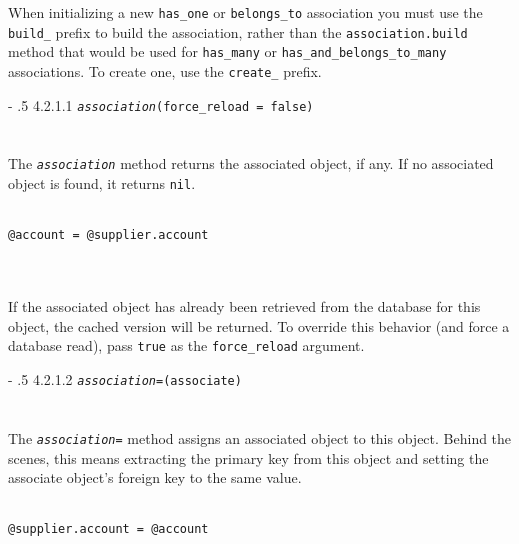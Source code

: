 \documentclass[10pt]{book}
\makeatletter
\renewcommand\paragraph{%
   \@startsection{paragraph}{4}{0mm}%
      {-\baselineskip}%
      {.5\baselineskip}%
      {\normalfont\scriptsize\bfseries}}
\makeatother
\begin{document}
When initializing a new \texttt{has\_one} or \texttt{belongs\_to} association you must use the \texttt{build\_} prefix to build the association, rather than the \texttt{association.build} method that would be used for \texttt{has\_many} or \texttt{has\_and\_belongs\_to\_many} associations. To create one, use the \texttt{create\_} prefix.

\paragraph{4.2.1.1 \texttt{\emph{association}(force\_reload = false)}}\\ \\\\

The \texttt{\emph{association}} method returns the associated object, if any. If no associated object is found, it returns \texttt{nil}.
\\ \\
\begin{minipage}{\textwidth}{\scriptsize
\begin{verbatim}
@account = @supplier.account
\end{verbatim}}
\end{minipage}
\\ \\

If the associated object has already been retrieved from the database  for this object, the cached version will be returned. To override this  behavior (and force a database read), pass \texttt{true} as the \texttt{force\_reload} argument.

\paragraph{4.2.1.2 \texttt{\emph{association}=(associate)}}\\ \\\\

The \texttt{\emph{association}=} method assigns an associated  object to this object. Behind the scenes, this means extracting the  primary key from this object and setting the associate object’s foreign  key to the same value.
\\ \\
\begin{minipage}{\textwidth}{\scriptsize
\begin{verbatim}
@supplier.account = @account
\end{verbatim}}
\end{minipage}
\\ \\
\end{document}
